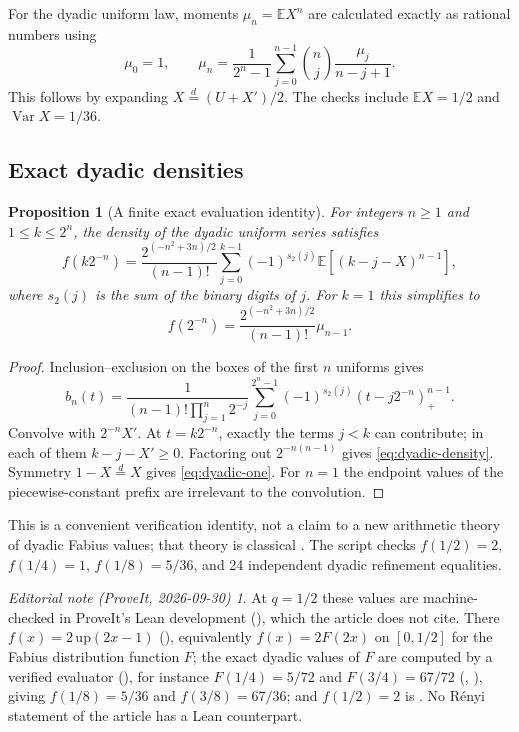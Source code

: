\documentclass[11pt,a4paper]{article}
\numberwithin{equation}{section}
\newtheorem{proposition}[proposition]{Proposition}
\theoremstyle{definition}\newaliascnt{definition}{theorem}
\theoremstyle{remark}\newaliascnt{remark}{theorem}
\newtheorem*{ednote}{Editorial note (ProveIt, 2026-09-30)}
\newcommand{\E}{\mathbb E}\newcommand{\Prb}{\mathbb P}
\newcommand{\Var}{\operatorname{Var}}
\begin{document}
For the dyadic uniform law, moments $\mu_n=\E X^n$ are calculated exactly
as rational numbers using
\begin{equation}
 \mu_0=1,\qquad
 \mu_n=\frac1{2^n-1}\sum_{j=0}^{n-1}
             \binom nj\frac{\mu_j}{n-j+1}.
 \label{eq:moment-recurrence}
\end{equation}
This follows by expanding $X\overset d=(U+X')/2$.
The checks include $\E X=1/2$ and $\Var X=1/36$.

\subsection{Exact dyadic densities}
\begin{proposition}[A finite exact evaluation identity]
\label{prop:dyadic}
For integers $n\ge1$ and $1\le k\le2^n$, the density of the dyadic uniform
series satisfies
\begin{equation}
 f(k2^{-n})=
 \frac{2^{(-n^2+3n)/2}}{(n-1)!}
 \sum_{j=0}^{k-1}(-1)^{s_2(j)}\E[(k-j-X)^{n-1}],
 \label{eq:dyadic-density}
\end{equation}
where $s_2(j)$ is the sum of the binary digits of $j$.
For $k=1$ this simplifies to
\begin{equation}
 f(2^{-n})=\frac{2^{(-n^2+3n)/2}}{(n-1)!}\mu_{n-1}.
 \label{eq:dyadic-one}
\end{equation}
\end{proposition}
\begin{proof}
Inclusion--exclusion on the boxes of the first $n$ uniforms gives
\[
 b_n(t)=\frac{1}{(n-1)!\prod_{j=1}^n2^{-j}}
       \sum_{j=0}^{2^n-1}(-1)^{s_2(j)}(t-j2^{-n})_+^{n-1}.
\]
Convolve with $2^{-n}X'$. At $t=k2^{-n}$, exactly the terms $j<k$ can
contribute; in each of them $k-j-X'\ge0$. Factoring out
$2^{-n(n-1)}$ gives \eqref{eq:dyadic-density}. Symmetry $1-X\overset d=X$
gives \eqref{eq:dyadic-one}. For $n=1$ the endpoint values of the
piecewise-constant prefix are irrelevant to the convolution.
\end{proof}
This is a convenient verification identity, not a claim to a new
arithmetic theory of dyadic Fabius values; that theory is classical
\cite{arias}. The script checks $f(1/2)=2$, $f(1/4)=1$, $f(1/8)=5/36$,
and 24 independent dyadic refinement equalities.
\begin{ednote}
At $q=1/2$ these values are machine-checked in ProveIt's Lean development
(), which the article
does not cite. There $f(x)=2\,\mathrm{up}(2x-1)$
(),
equivalently $f(x)=2F(2x)$ on $[0,1/2]$ for the Fabius distribution
function $F$; the exact dyadic values of $F$ are computed by a verified
evaluator (), for instance
$F(1/4)=5/72$ and $F(3/4)=67/72$ (,
), giving $f(1/8)=5/36$ and
$f(3/8)=67/36$; and $f(1/2)=2$ is .
No R\'enyi statement of the article has a Lean counterpart.
\end{ednote}
\end{document}
